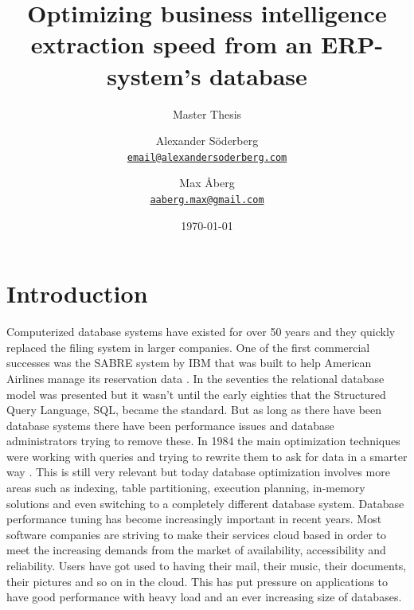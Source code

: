 \documentclass{cslthse-msc}
\author{
	Alexander Söderberg \\
	{\normalsize \href{mailto:email@alexandersoderberg.com}{\texttt{email@alexandersoderberg.com}}}
	\and
	Max Åberg \\
    {\normalsize \href{mailto:aaberg.max@gmail.com}{\texttt{aaberg.max@gmail.com}}}
}
\title{Optimizing business intelligence
extraction speed from an
ERP-system’s database}
\subtitle{Master Thesis}
\date{\today}
\begin{document}
\makefrontmatter

\chapter[Introduction]{Introduction}
Computerized database systems have existed for over 50 years and they quickly replaced the filing system in larger companies. One of the first commercial successes was the SABRE system by IBM that was built to help American Airlines manage its reservation data \cite{Head02}. In the seventies the relational database model was presented but it wasn't until the early eighties that the Structured Query Language, SQL, became the standard. But as long as there have been database systems there have been performance issues and database administrators trying to remove these. In 1984 the main optimization techniques were working with queries and trying to rewrite them to ask for data in a smarter way \cite{jarke1984query}. This is still very relevant but today database optimization involves more areas such as indexing, table partitioning, execution planning, in-memory solutions and even switching to a completely different database system.
Database performance tuning has become increasingly important in recent years. Most software companies are striving to make their services cloud based in order to meet the increasing demands from the market of availability, accessibility and reliability. Users have got used to having their mail, their music, their documents, their pictures and so on in the cloud. This has put pressure on applications to have good performance with heavy load and an ever increasing size of databases.\\\\
\end{document}
